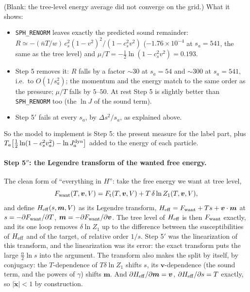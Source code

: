 \documentclass[11pt,aps,preprint,nofootinbib,superscriptaddress,tightenlines]{revtex4-2}
\def\st{\begin{equation}}
\def\stp{\end{equation}}
\let\oldparagraph\paragraph
\renewcommand{\paragraph}{\par\bigskip\oldparagraph}
\begin{document}
(Blank: the tree-level energy average did not converge on the grid.)  What it shows:
\begin{itemize}
\item \texttt{SPH\_RENORM} leaves exactly the predicted sound remainder: $R\simeq-(\bar nT/w)\,c_s^2(1-v^2)^2/(1-c_s^2v^2)$ ($-1.76\times10^{-4}$ at $s_a=541$, the same as the tree level)
  and $\mu/T=-\tfrac12\ln(1-c_s^2v^2)=0.193$.
\item Step 5 removes it: $R$ falls by a factor $\sim30$ at $s_a=54$ and $\sim300$ at $s_a=541$, i.e.\ to $O(1/s_a^2)$; the momentum and the energy match to the same order
  as the pressure; $\mu/T$ falls by $5$--$50$.  At rest Step 5 is slightly better than \texttt{SPH\_RENORM} too (the $\ln J$ of the sound term).
\item Step 5$'$ fails at every $s_a$, by $\Delta s^2/s_a$, as explained above.
\end{itemize}
So the model to implement is Step 5: the present measure for the label part, plus $T_a\big[\tfrac12\ln(1-c_s^2v_a^2)-\ln J^{\rm dyn}_a\big]$ added to the energy of each particle.

\paragraph{Step 5$''$: the Legendre transform of the wanted free energy.}  The clean form of ``everything in $H$'': take the free energy we want at tree level,
\st
F_{\rm want}(T,\bm v,V)=F_{\rm t}(T,\bm v,V)+T\,\delta\ln Z_1(T,\bm v,V) ,
\stp
and define $H_{\rm eff}(s,\bm m,V)$ as its Legendre transform, $H_{\rm eff}=F_{\rm want}+Ts+\bm v\cdot\bm m$ at $s=-\partial F_{\rm want}/\partial T$, $\bm m=-\partial F_{\rm want}/\partial\bm v$.  The
tree level of $H_{\rm eff}$ is then $F_{\rm want}$ exactly, and its one loop removes $\delta\ln Z_1$ up to the difference between the susceptibilities of $H_{\rm eff}$ and of the target,
of relative order $1/s$.  Step 5$'$ was the linearization of this transform, and the linearization was its error: the exact transform puts the large $\tfrac\alpha2\ln s$ into
the argument.  The transform also makes the split by itself, by conjugacy: the $T$-dependence of $T\delta\ln Z_1$ shifts $s$, its $\bm v$-dependence (the sound term, and the powers
of $\gamma$) shifts $\bm m$.  And $\partial H_{\rm eff}/\partial\bm m=\bm v$, $\partial H_{\rm eff}/\partial s=T$ exactly, so $|\dot{\bm x}|<1$ by construction.
\end{document}
